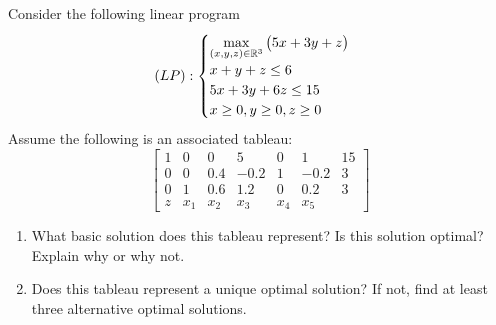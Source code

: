 \begin{problem}[Intermediate]
Consider the following linear program
\begin{equation*}
(LP): \begin{cases}
\displaystyle{\max_{(x,y,z) \in \mathbb{R}^3} \big( 5x+3y+z \big)} \\
x+y+z \leq 6 \\
5x+3y+6z \leq 15 \\
x \geq 0, y \geq 0, z \geq 0
\end{cases}
\end{equation*}
Assume the following is an associated tableau:
\begin{equation*}
\begin{bmatrix}
1 &   0 &   0 &    5 &   0 &   1  & 15 \\
0 &   0 & 0.4 & -0.2 &   1 & -0.2 &  3 \\
0 &   1 & 0.6 &  1.2 &   0 &  0.2 &  3 \\ \hline
z & x_1 & x_2 &  x_3 & x_4 &  x_5  
\end{bmatrix}
\end{equation*}
\begin{enumerate}
\item What basic solution does this tableau represent? Is this solution optimal? Explain why or why not.
\item Does this tableau represent a unique optimal solution? If not, find at least three alternative optimal solutions.
\end{enumerate}
\end{problem}